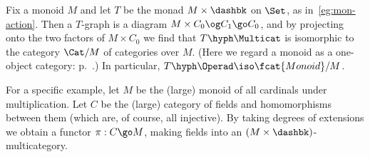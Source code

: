 \begin{example}	
Fix a monoid%
%
%
%
%
$M$ and let $T$ be the monad $M\times\dashbk$ on $\Set$, as
in~\ref{eg:mon-action}.  Then a $T$-graph is a diagram $M\times C_0 \og C_1
\go C_0$, and by projecting onto the two factors of $M \times C_0$ we find
that $T\hyph\Multicat$ is isomorphic to the category $\Cat/M$ of categories
over $M$.  (Here we regard a monoid as a one-object category:
p.~\pageref{p:degen-cat-monoid}.)  In particular, $T\hyph\Operad \iso
\fcat{Monoid}/M$.

For a specific example, let $M$ be the (large) monoid of all cardinals%
%
%
under multiplication.  Let $C$ be the (large) category of fields%
%
%
and
homomorphisms between them (which are, of course, all injective).  By
taking degrees%
%
%
of extensions we obtain a functor $\pi: C \go M$, making
fields into an $(M\times\dashbk)$-multicategory.
\end{example}

